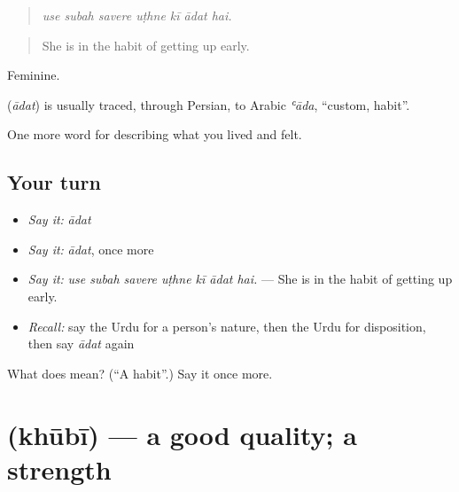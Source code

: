 \begin{quote}
      
\end{quote}

\begin{quote}
\emph{use subah savere uṭhne kī ādat hai.}
\end{quote}

\begin{quote}
She is in the habit of getting up early.
\end{quote}

Feminine.

\begin{cousinweb}
\textbf{} (\emph{ādat}) is usually traced, through Persian, to Arabic \emph{ʿāda}, \textquotedblleft{}custom, habit\textquotedblright{}.
\end{cousinweb}

\begin{grammarlens}[title={What you've built}]
One more word for describing what you lived and felt.
\end{grammarlens}

\subsection*{Your turn}
\begin{itemize}
\raggedright
  \item \emph{Say it:} \emph{ādat}
  \item \emph{Say it:} \emph{ādat}, once more
  \item \emph{Say it:} \emph{use subah savere uṭhne kī ādat hai.} — She is in the habit of getting up early.
  \item \emph{Recall:} say the Urdu for a person's nature, then the Urdu for disposition, then say \emph{ādat} again
\end{itemize}

\begin{tcolorbox}[breakable,colback=teal!4,colframe=teal!35!black,title={Before you move on}]
What does  mean? (\textquotedblleft{}A habit\textquotedblright{}.) Say it once more.
\end{tcolorbox}
\section[\texorpdfstring{\ur{خوبی} (khūbī)}{خوبی (khūbī)}]{ (khūbī) — a good quality; a strength}

\label{lesson:UR-C454-khubi}



